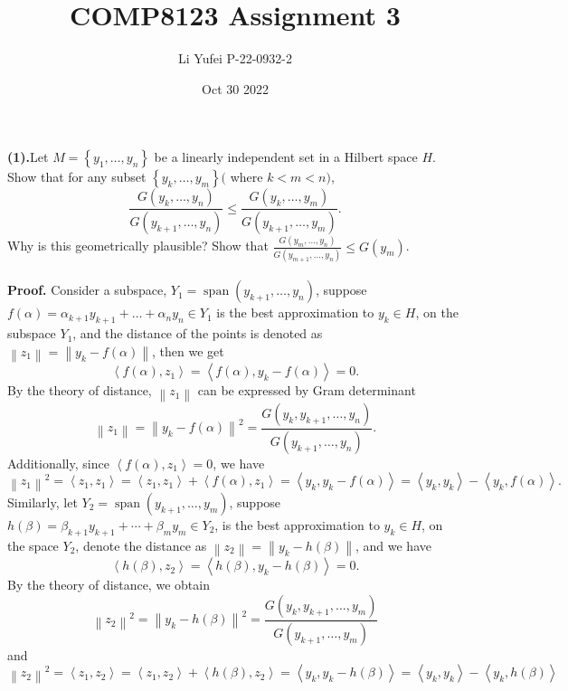 \documentclass{homework}
\title{COMP8123 \quad Assignment 3}
\author{Li Yufei \quad P-22-0932-2}
\date{Oct 30 2022}
\begin{document}
\maketitle


\textbf{(1).}Let $M=\left\{y_1, \ldots, y_n\right\}$ be a linearly independent set in a Hilbert space $H$. Show that for any subset $\left\{y_k, \ldots, y_m\right\} ($ where $k<m<n)$,
$$
\frac{G\left(y_k, \ldots, y_n\right)}{G\left(y_{k+1}, \ldots, y_n\right)} \le \frac{G\left(y_k, \ldots, y_m\right)}{G\left(y_{k+1}, \ldots, y_m\right)} .
$$
Why is this geometrically plausible? Show that $\frac{G\left(y_m, \ldots, y_n\right)}{G\left(y_{m+1}, \ldots, y_n\right)} \le G\left(y_m\right)$.
\\
\\
\textbf{Proof.} Consider a subspace, $Y_1=\operatorname{span}\left(y_{k+1}, \ldots, y_n\right)$, suppose $f(\alpha)=\alpha_{k+1} y_{k+1}+\ldots+\alpha_n y_n \in Y_1$ is the best approximation to $y_k \in H$, on the subspace $Y_1$, and the distance of the points is denoted as $\left\|z_1\right\|=\left\|y_k-f(\alpha)\right\|$, then we get
$$
\left\langle f(\alpha), z_1\right\rangle=\left\langle f(\alpha), y_k-f(\alpha)\right\rangle=0 .
$$
By the theory of distance, $\left\|z_1\right\|$ can be expressed by Gram determinant
$$
\left\|z_1\right\|=\left\|y_k-f(\alpha)\right\|^2=\frac{G\left(y_k, y_{k+1}, \ldots, y_n\right)}{G\left(y_{k+1}, \ldots, y_n\right)} .
$$
Additionally, since $\left\langle f(\alpha), z_1\right\rangle=0$, we have
$$
\left\|z_1\right\|^2=\left\langle z_1, z_1\right\rangle=\left\langle z_1, z_1\right\rangle+\left\langle f(\alpha), z_1\right\rangle=\left\langle y_k, y_k-f(\alpha)\right\rangle=\left\langle y_k, y_k\right\rangle-\left\langle y_k, f(\alpha)\right\rangle.
$$
Similarly, let $Y_2=\operatorname{span}\left(y_{k+1}, \ldots, y_m\right)$, suppose $h(\beta)=\beta_{k+1}y_{k+1}+\cdots+\beta_m y_m \in Y_2$, is the best approximation to $y_k \in H$, on the space $Y_2$, denote the distance as $\left\|z_2\right\|=\left\|y_k-h(\beta)\right\|$, and we have
$$
\left\langle h(\beta), z_2\right\rangle=\left\langle h(\beta), y_k-h(\beta)\right\rangle=0.
$$
By the theory of distance, we obtain
$$
\left\|z_2\right\|^2=\left\|y_k-h(\beta)\right\|^2=\frac{G\left(y_k, y_{k+1}, \ldots, y_m\right)}{G\left(y_{k+1}, \ldots, y_m\right)}
$$
and
$$
\left\|z_2\right\|^2=\left\langle z_1, z_2\right\rangle=\left\langle z_1, z_2\right\rangle+\left\langle h(\beta), z_2\right\rangle=\left\langle y_k, y_k-h(\beta)\right\rangle=\left\langle y_k, y_k\right\rangle-\left\langle y_k, h(\beta)\right\rangle
$$
\end{document}
